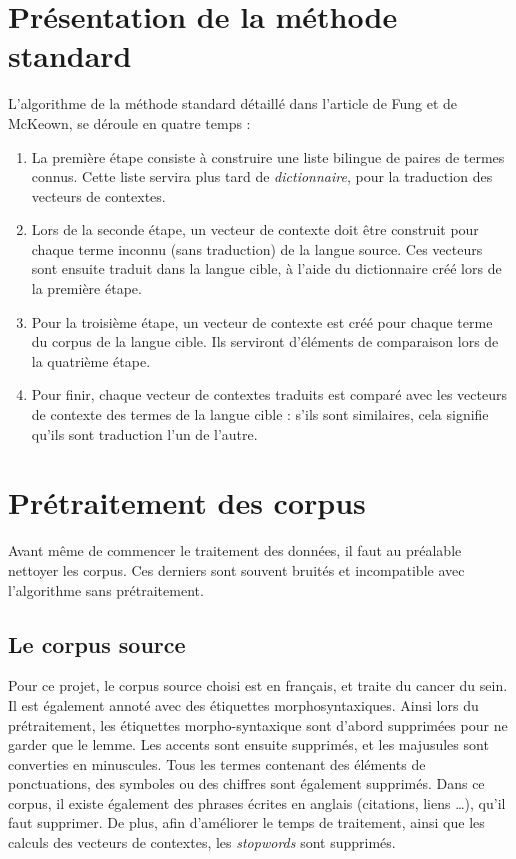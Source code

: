 
\section{Présentation de la méthode standard}

	L'algorithme de la méthode standard détaillé dans l'article de Fung et de McKeown\cite{Fung97findingterminology}, se déroule en quatre temps :
	\begin{enumerate}
		\item La première étape consiste à construire une liste bilingue de paires de termes connus. Cette liste servira plus tard de \textit{dictionnaire}, pour la traduction des vecteurs de contextes. 
		\item Lors de la seconde étape, un vecteur de contexte doit être construit pour chaque terme inconnu (sans traduction) de la langue source. Ces vecteurs sont ensuite traduit dans la langue cible, à l'aide du dictionnaire créé lors de la première étape.
		\item Pour la troisième étape, un vecteur de contexte est créé pour chaque terme du corpus de la langue cible. Ils serviront d'éléments de comparaison lors de la quatrième étape.
		\item Pour finir, chaque vecteur de contextes traduits est comparé avec les vecteurs de contexte des termes de la langue cible : s'ils sont similaires, cela signifie qu'ils sont traduction l'un de l'autre. 
	\end{enumerate}


\section{Prétraitement des corpus}
	
	Avant même de commencer le traitement des données, il faut au préalable nettoyer les corpus. Ces derniers sont souvent bruités et incompatible avec l'algorithme sans prétraitement.
	
	\subsection{Le corpus source}
	Pour ce projet, le corpus source choisi est en français, et traite du cancer du sein. Il est également annoté avec des étiquettes morphosyntaxiques. Ainsi lors du prétraitement, les étiquettes morpho-syntaxique sont d'abord supprimées pour ne garder que le lemme. Les accents sont ensuite supprimés, et les majusules sont converties en minuscules. Tous les termes contenant des éléments de ponctuations, des symboles ou des chiffres sont également supprimés. Dans ce corpus, il existe également des phrases écrites en anglais (citations, liens \dots), qu'il faut supprimer. De plus, afin d'améliorer le temps de traitement, ainsi que les calculs des vecteurs de contextes, les \textit{stopwords} sont supprimés.
		
